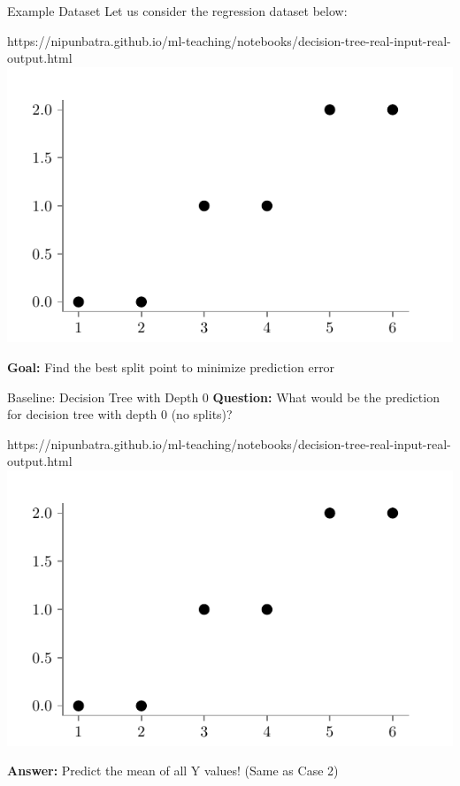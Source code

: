 \documentclass[usenames,dvipsnames]{beamer}
\begin{document}
    \begin{frame}{Example Dataset}
    Let us consider the regression dataset below:
    \begin{center}
    	\begin{notebookbox}{https://nipunbatra.github.io/ml-teaching/notebooks/decision-tree-real-input-real-output.html}
    		\includegraphics{../assets/decision-trees/figures/ri-ro-dataset.pdf}
    	  \end{notebookbox}
    \end{center}
    \textbf{Goal:} Find the best split point to minimize prediction error
    \end{frame}

    \begin{frame}{Baseline: Decision Tree with Depth 0}
    \textbf{Question:} What would be the prediction for decision tree with depth 0 (no splits)?
    \begin{center}
    	\begin{notebookbox}{https://nipunbatra.github.io/ml-teaching/notebooks/decision-tree-real-input-real-output.html}
    		\includegraphics{../assets/decision-trees/figures/ri-ro-dataset.pdf}
    	  \end{notebookbox}
    \end{center}
    
    \begin{keypointsbox}
    \textbf{Answer:} Predict the mean of all Y values! (Same as Case 2)
    \end{keypointsbox}
    \end{frame}
\end{document}
